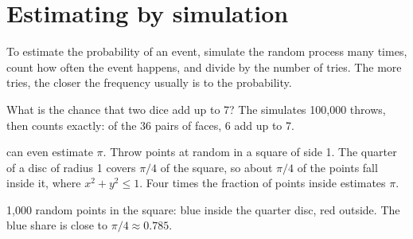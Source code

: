 \section{Estimating by simulation}

\begin{method}\label{met:g9:randomness-and-simulation:estimate}
To estimate the probability of an event, simulate
the random process many times, count how often the event happens, and divide by
the number of tries. The more tries, the closer the frequency usually is to the
probability.
\end{method}

What is the chance that two dice add up to 7? The  simulates 100,000
throws, then counts exactly: of the 36 pairs of faces, 6 add up to 7.

\label{lst:g9:randomness-and-simulation:seven}

\label{out:g9:randomness-and-simulation:seven}

 can even estimate $\pi$. Throw points at random in a square of side
1. The quarter of a disc of radius 1 covers $\pi / 4$ of the square, so about
$\pi / 4$ of the points fall inside it, where $x^2 + y^2 \le 1$. Four times the
fraction of points inside estimates $\pi$.

\begin{omfigure}

{\small 1,000 random points in the square: blue inside the quarter disc, red
outside. The blue share is close to $\pi / 4 \approx 0.785$.}
\end{omfigure}

